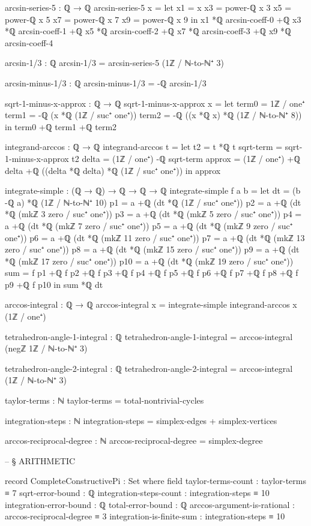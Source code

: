 \documentclass[11pt,a4paper]{book}
\begin{document}
\begin{code}
arcsin-series-5 : ℚ → ℚ
arcsin-series-5 x = 
  let x1 = x
      x3 = power-ℚ x 3
      x5 = power-ℚ x 5
      x7 = power-ℚ x 7
      x9 = power-ℚ x 9
  in x1 *ℚ arcsin-coeff-0
   +ℚ x3 *ℚ arcsin-coeff-1
   +ℚ x5 *ℚ arcsin-coeff-2
   +ℚ x7 *ℚ arcsin-coeff-3
   +ℚ x9 *ℚ arcsin-coeff-4

arcsin-1/3 : ℚ
arcsin-1/3 = arcsin-series-5 (1ℤ / ℕ-to-ℕ⁺ 3)

arcsin-minus-1/3 : ℚ
arcsin-minus-1/3 = -ℚ arcsin-1/3

sqrt-1-minus-x-approx : ℚ → ℚ
sqrt-1-minus-x-approx x = 
  let term0 = 1ℤ / one⁺
      term1 = -ℚ (x *ℚ (1ℤ / suc⁺ one⁺))
      term2 = -ℚ ((x *ℚ x) *ℚ (1ℤ / ℕ-to-ℕ⁺ 8))
  in term0 +ℚ term1 +ℚ term2

integrand-arccos : ℚ → ℚ
integrand-arccos t =
  let t2 = t *ℚ t
      sqrt-term = sqrt-1-minus-x-approx t2
      delta = (1ℤ / one⁺) -ℚ sqrt-term
      approx = (1ℤ / one⁺) +ℚ delta +ℚ ((delta *ℚ delta) *ℚ (1ℤ / suc⁺ one⁺))
  in approx


integrate-simple : (ℚ → ℚ) → ℚ → ℚ → ℚ
integrate-simple f a b =
  let dt = (b -ℚ a) *ℚ (1ℤ / ℕ-to-ℕ⁺ 10)
      p1 = a +ℚ (dt *ℚ (1ℤ / suc⁺ one⁺))
      p2 = a +ℚ (dt *ℚ (mkℤ 3 zero / suc⁺ one⁺))
      p3 = a +ℚ (dt *ℚ (mkℤ 5 zero / suc⁺ one⁺))
      p4 = a +ℚ (dt *ℚ (mkℤ 7 zero / suc⁺ one⁺))
      p5 = a +ℚ (dt *ℚ (mkℤ 9 zero / suc⁺ one⁺))
      p6 = a +ℚ (dt *ℚ (mkℤ 11 zero / suc⁺ one⁺))
      p7 = a +ℚ (dt *ℚ (mkℤ 13 zero / suc⁺ one⁺))
      p8 = a +ℚ (dt *ℚ (mkℤ 15 zero / suc⁺ one⁺))
      p9 = a +ℚ (dt *ℚ (mkℤ 17 zero / suc⁺ one⁺))
      p10 = a +ℚ (dt *ℚ (mkℤ 19 zero / suc⁺ one⁺))
      sum = f p1 +ℚ f p2 +ℚ f p3 +ℚ f p4 +ℚ f p5 +ℚ f p6 +ℚ f p7 +ℚ f p8 +ℚ f p9 +ℚ f p10
  in sum *ℚ dt

arccos-integral : ℚ → ℚ
arccos-integral x = integrate-simple integrand-arccos x (1ℤ / one⁺)

tetrahedron-angle-1-integral : ℚ
tetrahedron-angle-1-integral = arccos-integral (negℤ 1ℤ / ℕ-to-ℕ⁺ 3)

tetrahedron-angle-2-integral : ℚ  
tetrahedron-angle-2-integral = arccos-integral (1ℤ / ℕ-to-ℕ⁺ 3)

taylor-terms : ℕ
taylor-terms = total-nontrivial-cycles

integration-steps : ℕ
integration-steps = simplex-edges + simplex-vertices

arccos-reciprocal-degree : ℕ
arccos-reciprocal-degree = simplex-degree


-- § ARITHMETIC

record CompleteConstructivePi : Set where
  field
    taylor-terms-count : taylor-terms ≡ 7
    sqrt-error-bound : ℚ
    integration-steps-count : integration-steps ≡ 10
    integration-error-bound : ℚ
    total-error-bound : ℚ
    arccos-argument-is-rational : arccos-reciprocal-degree ≡ 3
    integration-is-finite-sum : integration-steps ≡ 10


\end{code}
\end{document}

